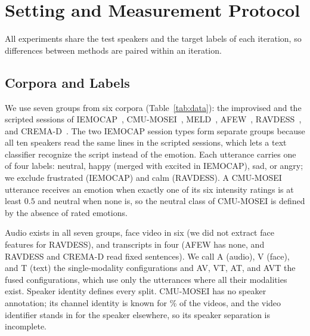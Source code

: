 \section{Setting and Measurement Protocol}
\label{sec:setting}

All experiments share the test speakers and the target labels of each iteration, so differences between methods are paired within an iteration.

\subsection{Corpora and Labels}
\label{sec:setting-data}

We use seven groups from six corpora (Table~\ref{tab:data}): the improvised and the scripted sessions of IEMOCAP~\cite{busso2008iemocap}, CMU-MOSEI~\cite{zadeh2018mosei}, MELD~\cite{poria2019meld}, AFEW~\cite{dhall2012afew}, RAVDESS~\cite{livingstone2018ravdess}, and CREMA-D~\cite{cao2014cremad}.
The two IEMOCAP session types form separate groups because all ten speakers read the same lines in the scripted sessions, which lets a text classifier recognize the script instead of the emotion.
Each utterance carries one of four labels: neutral, happy (merged with excited in IEMOCAP), sad, or angry; we exclude frustrated (IEMOCAP) and calm (RAVDESS).
A CMU-MOSEI utterance receives an emotion when exactly one of its six intensity ratings is at least $0.5$ and neutral when none is, so the neutral class of CMU-MOSEI is defined by the absence of rated emotions.

Audio exists in all seven groups, face video in six (we did not extract face features for RAVDESS), and transcripts in four (AFEW has none, and RAVDESS and CREMA-D read fixed sentences).
We call A (audio), V (face), and T (text) the single-modality configurations and AV, VT, AT, and AVT the fused configurations, which use only the utterances where all their modalities exist.
Speaker identity defines every split.
CMU-MOSEI has no speaker annotation; its channel identity is known for \% of the videos, and the video identifier stands in for the speaker elsewhere, so its speaker separation is incomplete.

